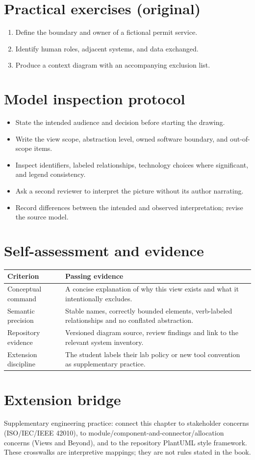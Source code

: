 \documentclass[10pt,letterpaper]{article}
\begin{document}
\section{Practical exercises (original)}
\begin{enumerate}
\item Define the boundary and owner of a fictional permit service.
\item Identify human roles, adjacent systems, and data exchanged.
\item Produce a context diagram with an accompanying exclusion list.
\end{enumerate}

\section{Model inspection protocol}
\begin{itemize}
\item State the intended audience and decision before starting the drawing.
\item Write the view scope, abstraction level, owned software boundary, and out-of-scope items.
\item Inspect identifiers, labeled relationships, technology choices where significant, and legend consistency.
\item Ask a second reviewer to interpret the picture without its author narrating.
\item Record differences between the intended and observed interpretation; revise the source model.
\end{itemize}

\section{Self-assessment and evidence}
\begin{tabularx}{\linewidth}{@{}YY@{}}\toprule
\textbf{Criterion} & \textbf{Passing evidence} \\ \midrule
Conceptual command & A concise explanation of why this view exists and what it intentionally excludes. \\
Semantic precision & Stable names, correctly bounded elements, verb-labeled relationships and no conflated abstraction. \\
Repository evidence & Versioned diagram source, review findings and link to the relevant system inventory. \\
Extension discipline & The student labels their lab policy or new tool convention as supplementary practice. \\
\bottomrule\end{tabularx}


\section{Extension bridge}
Supplementary engineering practice: connect this chapter to stakeholder concerns (ISO/IEC/IEEE 42010), to module/component-and-connector/allocation concerns (Views and Beyond), and to the repository PlantUML style framework. These crosswalks are interpretive mappings; they are not rules stated in the book.
\end{document}
